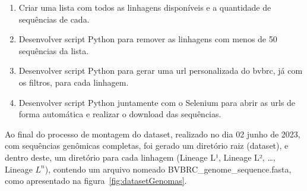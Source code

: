 \begin{enumerate}
  \item Criar uma lista com todos as linhagens disponíveis e a quantidade de sequências de cada.
  \item Desenvolver script Python para remover as linhagens com menos de 50 sequências da lista.
  \item Desenvolver script Python para gerar uma url personalizada do \gls{bvbrc}, já com os filtros, para cada linhagem.
  \item Desenvolver script Python juntamente com o Selenium para abrir as urls de forma automática e realizar o download das sequências.
\end{enumerate}

Ao final do processo de montagem do dataset, realizado no dia 02 junho de 2023, com sequências genômicas completas, foi gerado um diretório raiz (dataset), e dentro deste, um diretório para cada linhagem (Lineage L¹, Lineage L², \dots, Lineage $L^{n}$), contendo um arquivo nomeado \textnormal{BVBRC\_genome\_sequence.fasta}, como apresentado na figura~\ref{fig:datasetGenomas}.

